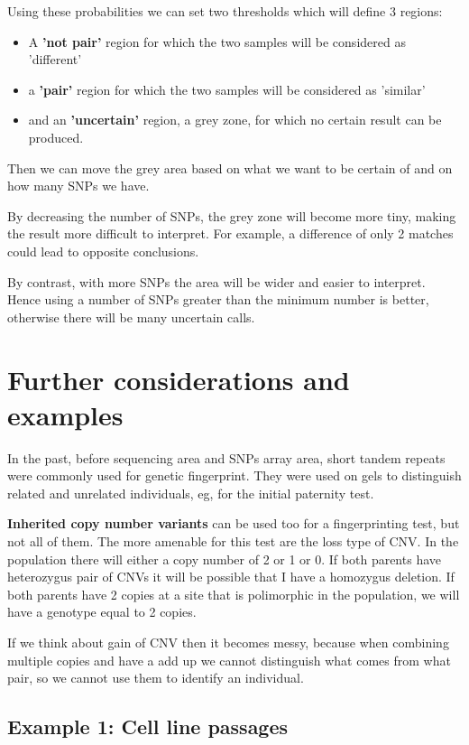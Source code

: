 Using these probabilities we can set two thresholds which will define 3 regions:
\begin{itemize}
	\item A \textbf{'not pair'} region for which the two samples will be considered as 'different'
 	\item a \textbf{'pair'} region for which the two samples will be considered as 'similar'
	\item and an \textbf{'uncertain'} region, a grey zone, for which no certain result can be produced. 
\end{itemize}

Then we can move the grey area based on what we want to be certain of and on how many SNPs we have.

By decreasing the number of SNPs, the grey zone will become more tiny, making the result more difficult to interpret. For example, a difference of only 2 matches could lead to opposite conclusions. 

By contrast, with more SNPs the area will be wider and easier to interpret. Hence using a number of SNPs greater than the minimum number is better, otherwise there will be many uncertain calls. 


\section*{Further considerations and examples}
In the past, before sequencing area and SNPs array area, short tandem repeats were commonly used for genetic fingerprint. They were used on gels to distinguish related and unrelated individuals, eg, for the initial paternity test. 

\textbf{Inherited copy number variants} can be used too for a fingerprinting test, but not all of them. The more amenable for this test are the loss type of CNV. In the population there will either a copy number of 2 or 1 or 0. If both parents have heterozygus pair of CNVs it will be possible that I have a homozygus deletion. If both parents have 2 copies at a site that is polimorphic in the population, we will have a genotype equal to 2 copies. 

If we think about gain of CNV then it becomes messy, because when combining multiple copies and have a add up we cannot distinguish what comes from what pair, so we cannot use them to identify an individual.


\subsection{Example 1: Cell line passages}

